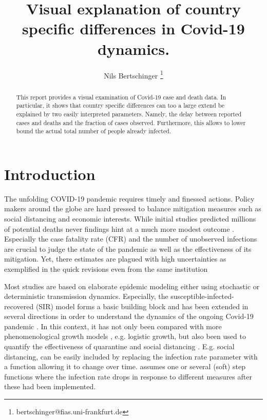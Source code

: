 \documentclass[fullpage,a4paper]{article}
\title{Visual explanation of country specific differences in
  Covid-19 dynamics.}
\author{Nils Bertschinger \thanks{bertschinger@fias.uni-frankfurt.de}}
\begin{document}
\maketitle%

\begin{abstract}
  This report provides a visual examination of Covid-19 case and death
  data. In particular, it shows that country specific differences can
  too a large extend be explained by two easily interpreted
  parameters. Namely, the delay between reported cases and deaths and
  the fraction of cases observed. Furthermore, this allows to lower
  bound the actual total number of people already infected.
\end{abstract}

\section{Introduction}

The unfolding COVID-19 pandemic requires timely and finessed
actions. Policy makers around the globe are hard pressed to balance
mitigation measures such as social distancing and economic
interests. While initial studies \cite{imperial1} predicted millions
of potential deaths never findings hint at a much more modest outcome
\cite{Lourenco2020.03.24.20042291,imperial2}. Especially the case
fatality rate (CFR) and the number of unobserved infections are
crucial to judge the state of the pandemic as well as the
effectiveness of its mitigation. Yet, there estimates are plagued with
high uncertainties as exemplified in the quick revisions even from the
same institution \cite{imperial1,imperial2}

Most studies are based on elaborate epidemic modeling either using
stochastic or deterministic transmission dynamics. Especially, the
susceptible-infected-recovered (SIR) model \cite{Newman} forms a
basic building block and has been extended in several directions in
order to understand the dynamics of the ongoing Covid-19 pandemic
\cite{arxiv:2002.07572,arxiv:2004.01105,10.1126/science.abb3221,https://www.medrxiv.org/content/10.1101/2020.02.27.20028639v2}.
In this context, it has not only been compared with more
phenomenological growth models
\cite{https://doi.org/10.1101/2020.03.12.20034595}, e.g. logistic
growth, but also been used to quantify the effectiveness of quarantine
and social distancing \cite{arxiv:2002.07572,arxiv:2004.01105}.
E.g. social distancing, can be easily included by replacing the
infection rate parameter with a function allowing it to change over
time. \cite{arxiv:2004.01105} assumes one or several (soft) step
functions where the infection rate drops in response to different
measures after these had been implemented.
\end{document}
